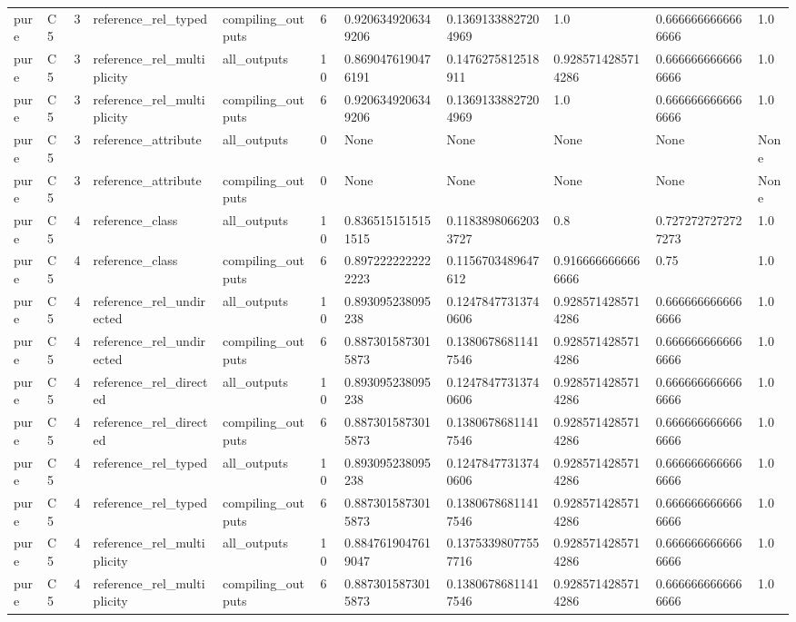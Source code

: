 \begin{tabular}{lllllllllll}
pure & C5 & 3 & reference\_rel\_typed & compiling\_outputs & 6 & 0.9206349206349206 & 0.13691338827204969 & 1.0 & 0.6666666666666666 & 1.0 \\
pure & C5 & 3 & reference\_rel\_multiplicity & all\_outputs & 10 & 0.8690476190476191 & 0.1476275812518911 & 0.9285714285714286 & 0.6666666666666666 & 1.0 \\
pure & C5 & 3 & reference\_rel\_multiplicity & compiling\_outputs & 6 & 0.9206349206349206 & 0.13691338827204969 & 1.0 & 0.6666666666666666 & 1.0 \\
pure & C5 & 3 & reference\_attribute & all\_outputs & 0 & None & None & None & None & None \\
pure & C5 & 3 & reference\_attribute & compiling\_outputs & 0 & None & None & None & None & None \\
pure & C5 & 4 & reference\_class & all\_outputs & 10 & 0.8365151515151515 & 0.11838980662033727 & 0.8 & 0.7272727272727273 & 1.0 \\
pure & C5 & 4 & reference\_class & compiling\_outputs & 6 & 0.8972222222222223 & 0.1156703489647612 & 0.9166666666666666 & 0.75 & 1.0 \\
pure & C5 & 4 & reference\_rel\_undirected & all\_outputs & 10 & 0.893095238095238 & 0.12478477313740606 & 0.9285714285714286 & 0.6666666666666666 & 1.0 \\
pure & C5 & 4 & reference\_rel\_undirected & compiling\_outputs & 6 & 0.8873015873015873 & 0.13806786811417546 & 0.9285714285714286 & 0.6666666666666666 & 1.0 \\
pure & C5 & 4 & reference\_rel\_directed & all\_outputs & 10 & 0.893095238095238 & 0.12478477313740606 & 0.9285714285714286 & 0.6666666666666666 & 1.0 \\
pure & C5 & 4 & reference\_rel\_directed & compiling\_outputs & 6 & 0.8873015873015873 & 0.13806786811417546 & 0.9285714285714286 & 0.6666666666666666 & 1.0 \\
pure & C5 & 4 & reference\_rel\_typed & all\_outputs & 10 & 0.893095238095238 & 0.12478477313740606 & 0.9285714285714286 & 0.6666666666666666 & 1.0 \\
pure & C5 & 4 & reference\_rel\_typed & compiling\_outputs & 6 & 0.8873015873015873 & 0.13806786811417546 & 0.9285714285714286 & 0.6666666666666666 & 1.0 \\
pure & C5 & 4 & reference\_rel\_multiplicity & all\_outputs & 10 & 0.8847619047619047 & 0.13753398077557716 & 0.9285714285714286 & 0.6666666666666666 & 1.0 \\
pure & C5 & 4 & reference\_rel\_multiplicity & compiling\_outputs & 6 & 0.8873015873015873 & 0.13806786811417546 & 0.9285714285714286 & 0.6666666666666666 & 1.0 \\

\end{tabular}
